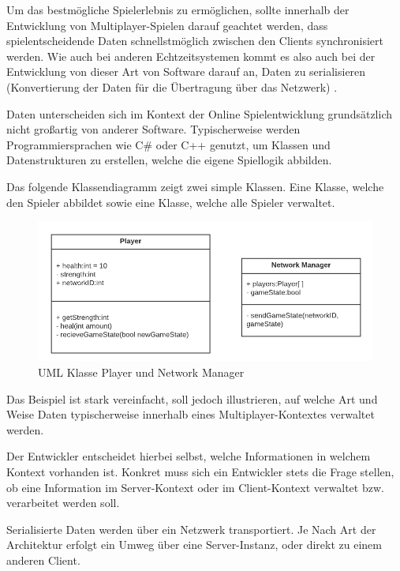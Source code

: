 Um das bestmögliche Spielerlebnis zu ermöglichen, sollte innerhalb der Entwicklung von Multiplayer-Spielen darauf geachtet werden, dass spielentscheidende Daten schnellstmöglich zwischen den Clients synchronisiert werden. Wie auch bei anderen Echtzeitsystemen \cite{Wikipedia.2021} kommt es also auch bei der Entwicklung von dieser Art von Software darauf an, Daten zu serialisieren (Konvertierung der Daten für die Übertragung über das Netzwerk) \cite{Wikipedia.2019}. 

Daten unterscheiden sich im Kontext der Online Spielentwicklung grundsätzlich nicht großartig von anderer Software. Typischerweise werden Programmiersprachen wie C\# oder C++ genutzt, um Klassen und Datenstrukturen zu erstellen, welche die eigene Spiellogik abbilden. \cite{Glinka.2008}

Das folgende Klassendiagramm zeigt zwei simple Klassen. Eine Klasse, welche den Spieler abbildet sowie eine Klasse, welche alle Spieler verwaltet.

\begin{figure}
	\centering
	\includegraphics[width=150mm]{images/UML_class_Player_NM.png}
	\caption[UML Klassen]{UML Klasse Player und Network Manager}
	\label{pic:UML_class_Player_NM}
\end{figure}

Das Beispiel ist stark vereinfacht, soll jedoch illustrieren, auf welche Art und Weise Daten typischerweise innerhalb eines Multiplayer-Kontextes verwaltet werden.

Der Entwickler entscheidet hierbei selbst, welche Informationen in welchem Kontext vorhanden ist. Konkret muss sich ein Entwickler stets die Frage stellen, ob eine Information im Server-Kontext oder im Client-Kontext verwaltet bzw. verarbeitet werden soll.

Serialisierte Daten werden über ein Netzwerk transportiert. Je Nach Art der Architektur erfolgt ein Umweg über eine Server-Instanz, oder direkt zu einem anderen Client. \cite{Smed.2002c}

